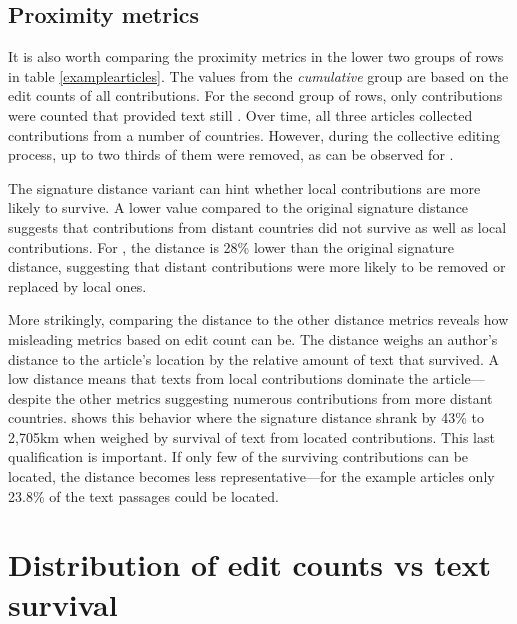 \subsection{Proximity metrics}

It is also worth comparing the proximity metrics in the lower two groups of rows in table \ref{examplearticles}.
The values from the \emph{cumulative} group are based on the edit counts of all contributions.
For the second group of rows, only contributions were counted that provided text still .
Over time, all three articles collected contributions from a number of countries. 
However, during the collective editing process, up to two thirds of them were removed, as can be observed for  . 

The signature distance variant  can hint whether local contributions are more likely to survive.
A lower  value compared to the original signature distance suggests that contributions from distant countries did not survive as well as local contributions.
For , the  distance is 28\% lower than  the original signature distance, suggesting that distant contributions were more likely to be removed or replaced by local ones.

More strikingly, comparing the  distance to the other distance metrics reveals how misleading metrics based on edit count can be.
The  distance weighs an author's distance to the article's location by the relative amount of text that survived.
A low  distance means that texts from local contributions dominate the article---despite the other metrics suggesting numerous contributions from more distant countries.
  shows this behavior where the signature distance shrank by 43\% to 2,705km when weighed by survival of text from located contributions. 
This last qualification is important.
If only few of the surviving contributions can be located, the  distance becomes less representative---for the example articles only 23.8\% of the text passages could be located.


\section{Distribution of edit counts vs text survival}\label{sec:editcountvstextsurvival}

